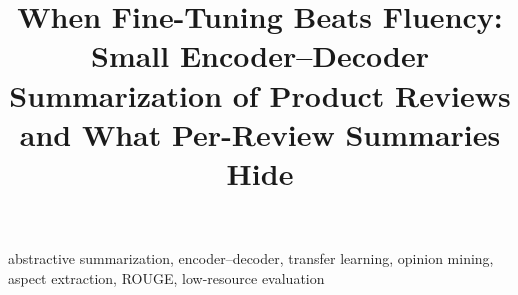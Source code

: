 \documentclass[conference]{IEEEtran}
\begin{document}
\title{When Fine-Tuning Beats Fluency:\\
Small Encoder--Decoder Summarization of Product Reviews\\
and What Per-Review Summaries Hide}

\author{
}

\maketitle

\begin{abstract}

\end{abstract}

\begin{IEEEkeywords}
abstractive summarization, encoder--decoder, transfer learning, opinion
mining, aspect extraction, ROUGE, low-resource evaluation
\end{IEEEkeywords}











\balance


\end{document}
